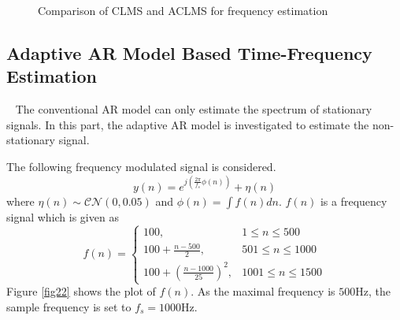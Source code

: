 \documentclass[10pt]{article}
\begin{document}
\begin{figure}[htbp]
    \centering
    \caption{Comparison of CLMS and ACLMS for frequency estimation}
    \label{fig21}
\end{figure}

\subsection{Adaptive AR Model Based Time-Frequency Estimation} \label{part3.2}
\ \indent
The conventional AR model can only estimate the spectrum of stationary signals. 
In this part, the adaptive AR model is investigated to estimate the non-stationary
signal.

The following frequency modulated signal is considered.
\begin{equation}
	y(n) = e^{j \left( \frac{2\pi}{f_s} \phi(n) \right)} + \eta(n) \label{eq86}
\end{equation}
where $\eta(n) \sim \mathcal{CN} (0,0.05)$ and $\phi(n) = \int f(n) dn $. 
$f(n)$ is a frequency signal which is given as
\begin{equation}
	f(n) = \begin{cases}
		100, &1 \leq n \leq 500\\
		100 + \frac{n-500}{2}, &501 \leq n \leq 1000 \\
		100 + \left( \frac{n-1000}{25} \right)^2, &1001 \leq n \leq 1500
	\end{cases}
\end{equation}
Figure \ref{fig22} shows the plot of $f(n)$. As the maximal frequency is $500$Hz,
the sample frequency is set to $f_s=1000$Hz.
\end{document}
